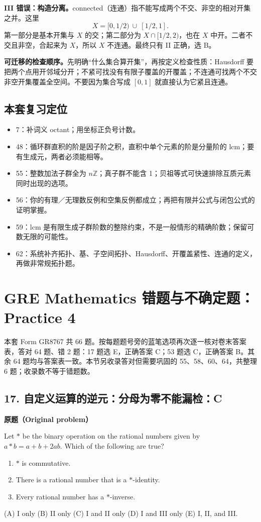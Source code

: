 \documentclass[11pt,a4paper,fontset=fandol]{ctexart}
\begin{document}
\textbf{III 错误：构造分离。}connected（连通）指不能写成两个不交、非空的相对开集之并。这里
\[
X=[0,1/2)\ \cup\ [1/2,1].
\]
第一部分是基本开集与 $X$ 的交；第二部分为 $X\cap[1/2,2)$，也在 $X$ 中开。二者不交且非空，合起来为 $X$，所以 $X$ 不连通。最终只有 II 正确，选 B。

\textbf{可迁移的检查顺序。}先明确“什么集合算开集”，再按定义检查性质：Hausdorff 要把两个点用开邻域分开；不紧可找没有有限子覆盖的开覆盖；不连通可找两个不交非空开集覆盖全空间。不要因为集合写成 $[0,1]$ 就直接认为它紧且连通。

\subsection{本套复习定位}
\begin{itemize}
\item 7：补词义 octant；用坐标正负号计数。
\item 48：循环群直积的阶是因子阶之积，直积中单个元素的阶是分量阶的 lcm；要有生成元，两者必须能相等。
\item 55：整数加法子群全为 $n\mathbb Z$；真子群不能含 1；贝祖等式可快速排除互质元素同时出现的选项。
\item 56：你的有理／无理数反例和空集反例都成立；再把有限并公式与闭包公式的证明掌握。
\item 59：lcm 是有限生成子群阶数的整除约束，不是一般情形的精确阶数；保留可数无限的可能性。
\item 62：系统补齐拓扑、基、子空间拓扑、Hausdorff、开覆盖紧性、连通的定义，再做非常规拓扑题。
\end{itemize}

\clearpage
\section{GRE Mathematics 错题与不确定题：Practice 4}
本套 Form GR8767 共 66 题。按每题题号旁的蓝笔选项再次逐一核对卷末答案表，答对 64 题、错 2 题：17 题选 E，正确答案 C；53 题选 C，正确答案 B。其余 64 题均与答案表一致。本节另收录答对但需要巩固的 55、58、60、64，共整理 6 题；收录数不等于错题数。

\subsection{17. 自定义运算的逆元：分母为零不能漏检：C}
\label{p4:q17}
\textbf{原题（Original problem）}

Let $*$ be the binary operation on the rational numbers given by $a*b=a+b+2ab$. Which of the following are true?
\begin{enumerate}[label=\Roman*.]
\item $*$ is commutative.
\item There is a rational number that is a $*$-identity.
\item Every rational number has a $*$-inverse.
\end{enumerate}
(A) I only \quad (B) II only \quad (C) I and II only \quad (D) I and III only \quad (E) I, II, and III.
\end{document}
